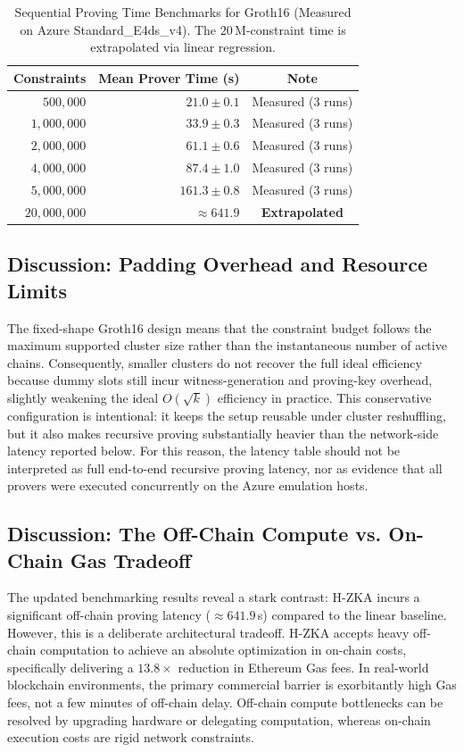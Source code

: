 \documentclass[journal]{IEEEtran}
\begin{document}
\begin{table}[h!]
\centering
\caption{Sequential Proving Time Benchmarks for Groth16 (Measured on Azure Standard\_E4ds\_v4). The $20\,$M-constraint time is extrapolated via linear regression.}
\label{tab:extrapolation}
\begin{tabular}{rrc}
\toprule
Constraints & Mean Prover Time (s) & Note \\
\midrule
$500{,}000$ & $21.0 \pm 0.1$ & Measured ($3$ runs) \\
$1{,}000{,}000$ & $33.9 \pm 0.3$ & Measured ($3$ runs) \\
$2{,}000{,}000$ & $61.1 \pm 0.6$ & Measured ($3$ runs) \\
$4{,}000{,}000$ & $87.4 \pm 1.0$ & Measured ($3$ runs) \\
$5{,}000{,}000$ & $161.3 \pm 0.8$ & Measured ($3$ runs) \\
\midrule
$20{,}000{,}000$ & $\approx \mathbf{641.9}$ & \textbf{Extrapolated} \\
\bottomrule
\end{tabular}
\end{table}

\subsection{Discussion: Padding Overhead and Resource Limits}

The fixed-shape Groth16 design means that the constraint budget follows the maximum supported cluster size rather than the instantaneous number of active chains. Consequently, smaller clusters do not recover the full ideal efficiency because dummy slots still incur witness-generation and proving-key overhead, slightly weakening the ideal $O(\sqrt{k})$ efficiency in practice. This conservative configuration is intentional: it keeps the setup reusable under cluster reshuffling, but it also makes recursive proving substantially heavier than the network-side latency reported below. For this reason, the latency table should not be interpreted as full end-to-end recursive proving latency, nor as evidence that all provers were executed concurrently on the Azure emulation hosts.

\subsection{Discussion: The Off-Chain Compute vs. On-Chain Gas Tradeoff}
\label{sec:tradeoff}
The updated benchmarking results reveal a stark contrast: H-ZKA incurs a significant off-chain proving latency ($\approx 641.9\,$s) compared to the linear baseline. However, this is a deliberate architectural tradeoff. H-ZKA accepts heavy off-chain computation to achieve an absolute optimization in on-chain costs, specifically delivering a $13.8\times$ reduction in Ethereum Gas fees. In real-world blockchain environments, the primary commercial barrier is exorbitantly high Gas fees, not a few minutes of off-chain delay. Off-chain compute bottlenecks can be resolved by upgrading hardware or delegating computation, whereas on-chain execution costs are rigid network constraints.
\end{document}
